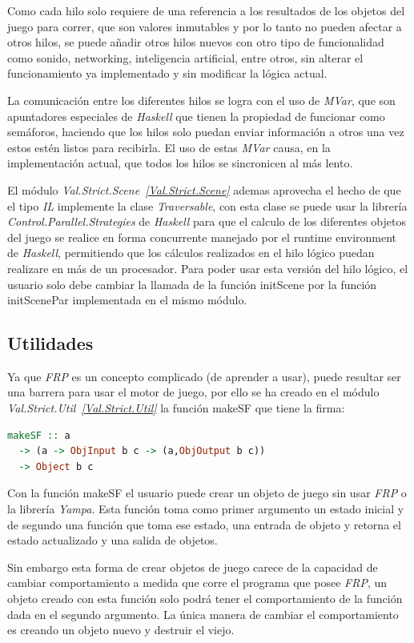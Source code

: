 Como cada hilo solo requiere de una referencia a los resultados de los objetos del juego para correr, que son valores inmutables y por lo tanto no pueden afectar a otros hilos, se puede añadir otros hilos nuevos con otro tipo de funcionalidad como sonido, networking, inteligencia artificial, entre otros, sin alterar el funcionamiento ya implementado y sin modificar la lógica actual.

La comunicación entre los diferentes hilos se logra con el uso de \emph{MVar}, que son apuntadores especiales de \emph{Haskell} que tienen la propiedad de funcionar como semáforos, haciendo que los hilos solo puedan enviar información a otros una vez estos estén listos para recibirla. El uso de estas \emph{MVar} causa, en la implementación actual, que todos los hilos se sincronicen al más lento.

El módulo \emph{Val.Strict.Scene~\ref{Val.Strict.Scene}} ademas aprovecha el hecho de que el tipo \emph{IL} implemente la clase \emph{Traversable}, con esta clase se puede usar la librería \emph{Control.Parallel.Strategies} de \emph{Haskell} para que el calculo de los diferentes objetos del juego se realice en forma concurrente manejado por el runtime environment de \emph{Haskell}, permitiendo que los cálculos realizados en el hilo lógico puedan realizare en más de un procesador. Para poder usar esta versión del hilo lógico, el usuario solo debe cambiar la llamada de la función initScene por la función initScenePar implementada en el mismo módulo.

\subsection{Utilidades}

Ya que \emph{FRP} es un concepto complicado (de aprender a usar), puede resultar ser una barrera para usar el motor de juego, por ello se ha creado en el módulo \emph{Val.Strict.Util~\ref{Val.Strict.Util}} la función makeSF que tiene la firma:

\begin{lstlisting}[frame=single,language=Haskell]
makeSF :: a
  -> (a -> ObjInput b c -> (a,ObjOutput b c))
  -> Object b c
\end{lstlisting}

Con la función makeSF el usuario puede crear un objeto de juego sin usar \emph{FRP} o la librería \emph{Yampa}. Esta función toma como primer argumento un estado inicial y de segundo una función que toma ese estado, una entrada de objeto y retorna el estado actualizado y una salida de objetos.

Sin embargo esta forma de crear objetos de juego carece de la capacidad de cambiar comportamiento a medida que corre el programa que posee \emph{FRP}, un objeto creado con esta función solo podrá tener el comportamiento de la función dada en el segundo argumento. La única manera de cambiar el comportamiento es creando un objeto nuevo y destruir el viejo.

